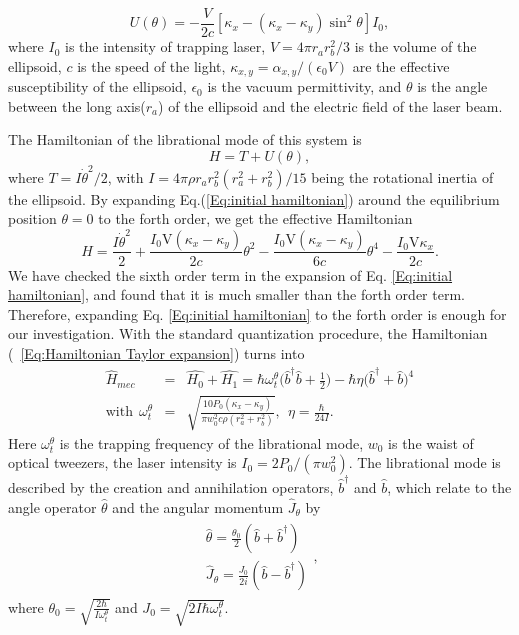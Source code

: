 \documentclass[pra,aps,superscriptaddress,showpacs,preprint]{revtex4}%
\begin{document}
\begin{equation}
U(\theta)=-\frac{V}{2c}[\kappa_{x}-(\kappa_{x}-\kappa_{y})\sin^2\theta]I_{0},
\label{Eq:the potential of tweezers}
\end{equation}
where $I_{0}$ is the intensity of trapping laser, $V=4\pi r_{a}r_{b}^{2}/3$ is the volume of the ellipsoid, $c$ is the speed of the light, $\kappa_{x,y}=\alpha_{x,y}/(\epsilon_{0}V)$ are the effective susceptibility of the ellipsoid, $\epsilon_{0}$ is the vacuum permittivity, and $\theta$ is the angle between the long axis($r_{a}$) of the ellipsoid and the electric field of the laser beam.

The Hamiltonian of the librational mode of this system is
\begin{equation}
H=T+U(\theta)
\label{Eq:initial hamiltonian},
\end{equation}
where $T=I\dot{\theta}^2/2$, with $I=4\pi\rho r_{a} r_{b}^2(r_{a}^2+r_{b}^2)/15$ being the rotational inertia of the ellipsoid.
By expanding Eq.(\ref{Eq:initial hamiltonian}) around the equilibrium position $\theta=0$ to the forth order, we get the effective Hamiltonian
\begin{equation}
H=\frac{I\dot{\theta}^2}{2}+\frac{I_0\text{V}(\kappa_{x}-\kappa_{y})}{2c}\theta^2-\frac{I_0\text{V}(\kappa_{x}-\kappa_{y})}{6c}\theta^4-\frac{I_0\text{V}\kappa_{x}}{2c}.
\label{Eq:Hamiltonian Taylor expansion}
\end{equation}
We have checked the sixth order term in the expansion of Eq. \eqref{Eq:initial hamiltonian}, and found that it is much smaller than the forth order term. Therefore,
 expanding Eq. \eqref{Eq:initial hamiltonian} to  the forth order is enough for our investigation. With the standard quantization procedure, the Hamiltonian (~\ref{Eq:Hamiltonian Taylor expansion}) turns into
\begin{eqnarray}
\hat{H}_{mec}&=&\hat{H_{0}}+\hat{H_{1}}=\hbar\omega_{t}^{\theta}\Big(\hat{b}^\dag\hat{b}+\frac{1}{2}\Big)-\hbar\eta\Big(\hat{b}^\dag+\hat{b}\Big)^{4}\nonumber\\
\text{with}~~ \omega_{t}^{\theta}&=&\sqrt{\frac{10P_{0}(\kappa_{x}-\kappa_{y})}{\pi w_{0}^{2}c\rho(r_{a}^{2}+r_{b}^{2})}},  ~~\eta=\frac{\hbar}{24I}
\label{Eq:Hamiltonian simplified}.
\end{eqnarray}
Here $\omega_{t}^{\theta}$ is the trapping frequency of the librational mode, $w_{0}$ is the waist of optical tweezers, the laser intensity is $I_{0}=2P_{0}/(\pi w_{0}^{2})$. The librational mode is described by the creation and annihilation operators, $\hat{b}^{\dag}$ and $\hat{b}$, which relate to the angle operator $\hat{\theta}$ and the angular momentum $\hat{J}_{\theta}$ by
 \begin{eqnarray}
\begin{aligned}
\hat{\theta}=\frac{\theta_{0}}{2}(\hat{b}+\hat{b}^{\dag})\\
\hat{J}_{\theta}=\frac{J_{0}}{2i}(\hat{b}-\hat{b}^{\dag})
\end{aligned}
\label{Eq:b phi },
\end{eqnarray}
where $\theta_{0}=\sqrt{\frac{2\hbar}{I\omega_{t}^{\theta}}}$ and $J_{0}=\sqrt{2I\hbar\omega_{t}^{\theta}}$.
\end{document}
